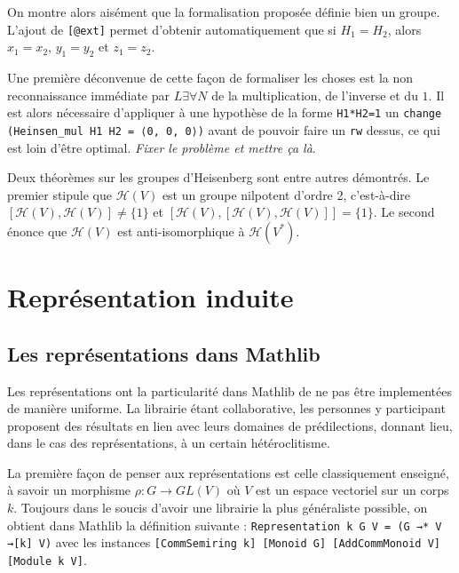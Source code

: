 \documentclass[10pt]{article}
\theoremstyle{definition}
\begin{document}
On montre alors aisément que  la formalisation proposée définie bien un groupe. L'ajout de \lstinline|[@ext]| permet d'obtenir automatiquement que si $H_1=H_2$, alors $x_1=x_2$, $y_1=y_2$ et $z_1=z_2$.
\newline

Une première déconvenue de cette façon de formaliser les choses est la non reconnaissance immédiate par $L\exists\forall N$ de la multiplication, de l'inverse et du $1$. Il est alors nécessaire d'appliquer à une hypothèse de la forme \lstinline|H1*H2=1| un \lstinline|change (Heinsen_mul H1 H2 = ⟨0, 0, 0⟩)| avant de pouvoir faire un \lstinline|rw| dessus, ce qui est loin d'être optimal.
\textit{Fixer le problème et mettre ça là}.
\newline

Deux théorèmes sur les groupes d'Heisenberg sont entre autres démontrés. Le premier stipule que $\mathcal{H}(V)$ est un groupe nilpotent d'ordre 2, c'est-à-dire $[\mathcal{H}(V),\mathcal{H}(V)]\ne\{1\}$ et $[\mathcal{H}(V),[\mathcal{H}(V),\mathcal{H}(V)]]=\{1\}$.
\newline
Le second énonce que $\mathcal{H}(V)$ est anti-isomorphique à $\mathcal{H}(V^*)$.


\section{Représentation induite}

\subsection{Les représentations dans Mathlib}
Les représentations ont la particularité dans Mathlib de ne pas être implementées de manière uniforme. La librairie étant collaborative, les personnes y participant proposent des résultats en lien avec leurs domaines de prédilections, donnant lieu, dans le cas des représentations, à un certain hétéroclitisme.
\newline

La première façon de penser aux représentations est celle classiquement enseigné, à savoir un morphisme $\rho : G \rightarrow GL(V)$ où $V$ est un espace vectoriel sur un corps $k$. Toujours dans le soucis d'avoir une librairie la plus généraliste possible, on obtient dans Mathlib la définition suivante : \lstinline|Representation k G V = (G →* V →[k] V)| avec les instances \lstinline|[CommSemiring k] [Monoid G] [AddCommMonoid V] [Module k V]|.
\newline
\end{document}
